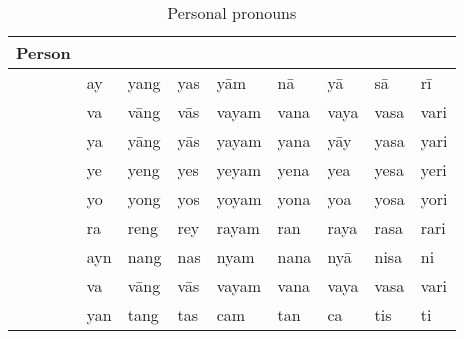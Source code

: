 \begin{table}[tp]\centering
\caption{Personal pronouns}

\begin{tabu} to \linewidth{S X[c] X[c] X[c] X[c] X[c] X[c] X[c] X[c]}
\tableheaderfont\toprule
Person
	& \Top{}
	& \Aarg{}
	& \Parg{}
	& \Dat{}
	& \Gen{}
	& \Loc{}
	& \Caus{}
	& \Ins{}
	\\
\toprule

\Fsg{}
	& ay	%
	& yang	%
	& yas	%
	& yām	%
	& nā	%
	& yā	%
	& sā	%
	& rī	%
	\\
	
\midrule

\Ssg{}
	& va	%
	& vāng	%
	& vās	%
	& vayam	%
	& vana	%
	& vaya	%
	& vasa	%
	& vari	%
	\\

\midrule

\TsgM{}
	& ya	%
	& yāng	%
	& yās	%
	& yayam	%
	& yana	%
	& yāy	%
	& yasa	%
	& yari	%
	\\

\TsgF{}
	& ye	%
	& yeng	%
	& yes	%
	& yeyam	%
	& yena	%
	& yea	%
	& yesa	%
	& yeri	%
	\\

\TsgN{}
	& yo	%
	& yong	%
	& yos	%
	& yoyam	%
	& yona	%
	& yoa	%
	& yosa	%
	& yori	%
	\\

\TsgI{}
	& ra	%
	& reng	%
	& rey	%
	& rayam	%
	& ran	%
	& raya	%
	& rasa	%
	& rari	%
	\\

\midrule

\Fpl{}
	& ayn	%
	& nang	%
	& nas	%
	& nyam	%
	& nana	%
	& nyā	%
	& nisa	%
	& ni	%
	\\
	
\midrule

\Spl{}
	& va	%
	& vāng	%
	& vās	%
	& vayam	%
	& vana	%
	& vaya	%
	& vasa	%
	& vari	%
	\\

\midrule

\TplM{}
	& yan	%
	& tang	%
	& tas	%
	& cam	%
	& tan	%
	& ca	%
	& tis	%
	& ti	%
	\\


\end{tabu}
\end{table}
